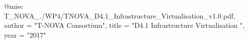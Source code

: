 @misc{ T_NOVA_./WP4/TNOVA_D4.1_Infrastructure_Virtualisation_v1.0.pdf,
       author = "T-NOVA Consortium",
       title = "D4.1 Infrastructure Virtualisation ",
       year = "2017" }
